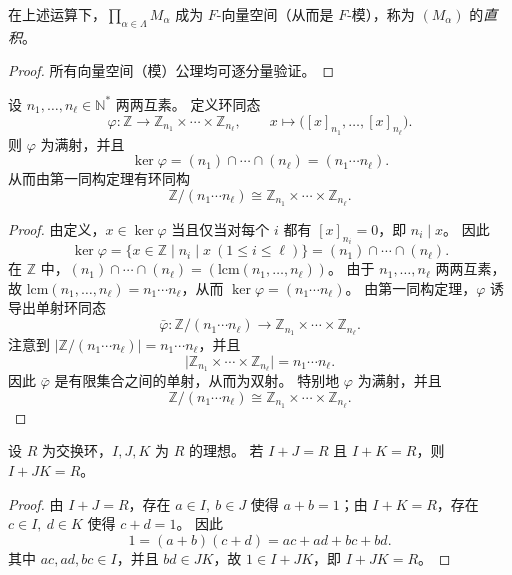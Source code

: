 \documentclass[lang=cn,a4paper,newtx]{elegantbook}
\begin{document}
\begin{proposition}
  在上述运算下，$\prod_{\alpha\in\Lambda} M_{\alpha}$ 成为 $F$-向量空间（从而是 $F$-模），称为 $(M_{\alpha})$ 的\emph{直积}。
\end{proposition}

\begin{proof}
  所有向量空间（模）公理均可逐分量验证。
\end{proof}

\begin{theorem}
  设 $n_1,\dots,n_{\ell}\in\mathbb{N}^{*}$ 两两互素。
  定义环同态
  \[
    \varphi:\mathbb{Z}\to\mathbb{Z}_{n_1}\times\cdots\times\mathbb{Z}_{n_{\ell}},\qquad
    x\mapsto \bigl([x]_{n_1},\dots,[x]_{n_{\ell}}\bigr).
  \]
  则 $\varphi$ 为满射，并且
  \[
    \ker\varphi=(n_1)\cap\cdots\cap(n_{\ell})=(n_1\cdots n_{\ell}).
  \]
  从而由第一同构定理有环同构
  \[
    \mathbb{Z}/(n_1\cdots n_{\ell})\cong \mathbb{Z}_{n_1}\times\cdots\times\mathbb{Z}_{n_{\ell}}.
  \]
\end{theorem}

\begin{proof}
  由定义，$x\in\ker\varphi$ 当且仅当对每个 $i$ 都有 $[x]_{n_i}=0$，即 $n_i\mid x$。
  因此
  \[
    \ker\varphi=\{x\in\mathbb{Z}\mid n_i\mid x\ (1\le i\le \ell)\}=(n_1)\cap\cdots\cap(n_{\ell}).
  \]
  在 $\mathbb{Z}$ 中，$(n_1)\cap\cdots\cap(n_{\ell})=(\mathrm{lcm}(n_1,\dots,n_{\ell}))$。
  由于 $n_1,\dots,n_{\ell}$ 两两互素，故 $\mathrm{lcm}(n_1,\dots,n_{\ell})=n_1\cdots n_{\ell}$，从而 $\ker\varphi=(n_1\cdots n_{\ell})$。
  由第一同构定理，$\varphi$ 诱导出单射环同态
  \[
    \bar\varphi: \mathbb{Z}/(n_1\cdots n_{\ell})\to \mathbb{Z}_{n_1}\times\cdots\times\mathbb{Z}_{n_{\ell}}.
  \]
  注意到 $\bigl|\mathbb{Z}/(n_1\cdots n_{\ell})\bigr|=n_1\cdots n_{\ell}$，并且
  \[
    \bigl|\mathbb{Z}_{n_1}\times\cdots\times\mathbb{Z}_{n_{\ell}}\bigr|=n_1\cdots n_{\ell}.
  \]
  因此 $\bar\varphi$ 是有限集合之间的单射，从而为双射。
  特别地 $\varphi$ 为满射，并且
  \[
    \mathbb{Z}/(n_1\cdots n_{\ell})\cong \mathbb{Z}_{n_1}\times\cdots\times\mathbb{Z}_{n_{\ell}}.
  \]
\end{proof}

\begin{lemma}
  设 $R$ 为交换环，$I,J,K$ 为 $R$ 的理想。
  若 $I+J=R$ 且 $I+K=R$，则 $I+JK=R$。
\end{lemma}

\begin{proof}
  由 $I+J=R$，存在 $a\in I,\ b\in J$ 使得 $a+b=1$；由 $I+K=R$，存在 $c\in I,\ d\in K$ 使得 $c+d=1$。
  因此
  \[
    1=(a+b)(c+d)=ac+ad+bc+bd.
  \]
  其中 $ac,ad,bc\in I$，并且 $bd\in JK$，故 $1\in I+JK$，即 $I+JK=R$。
\end{proof}
\end{document}
